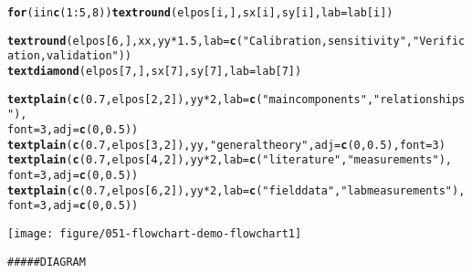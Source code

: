 \documentclass{article}\usepackage[]{graphicx}\usepackage[]{color}
\makeatletter
\def\maxwidth{ %
  \ifdim\Gin@nat@width>\linewidth
    \linewidth
  \else
    \Gin@nat@width
  \fi
}
\newcommand{\hlfunctioncall}[1]{\textcolor[rgb]{0.501960784313725,0,0.329411764705882}{\textbf{#1}}}%
\newcommand{\hlstring}[1]{\textcolor[rgb]{0.6,0.6,1}{#1}}%
\newcommand{\hlcomment}[1]{\textcolor[rgb]{0.180392156862745,0.6,0.341176470588235}{#1}}%
\newenvironment{kframe}{%
 \def\at@end@of@kframe{}%
 \ifinner\ifhmode%
  \def\at@end@of@kframe{\end{minipage}}%
  \begin{minipage}{\columnwidth}%
 \fi\fi%
 \def\FrameCommand##1{\hskip\@totalleftmargin \hskip-\fboxsep
 \colorbox{shadecolor}{##1}\hskip-\fboxsep
     \hskip-\linewidth \hskip-\@totalleftmargin \hskip\columnwidth}%
 \MakeFramed {\advance\hsize-\width
   \@totalleftmargin\z@ \linewidth\hsize
   \@setminipage}}%
 {\par\unskip\endMakeFramed%
 \at@end@of@kframe}
\newenvironment{knitrout}{}{} %
\makeatother
\begin{document}
\begin{knitrout}
\begin{kframe}
\begin{alltt}
\hlfunctioncall{for} (i in \hlfunctioncall{c}(1:5, 8)) \hlfunctioncall{textround}(elpos[i, ], sx[i], sy[i], lab = lab[i])

\hlfunctioncall{textround}(elpos[6, ], xx, yy * 1.5, lab = \hlfunctioncall{c}(\hlstring{"Calibration,sensitivity"}, \hlstring{"Verification,validation"}))
\hlfunctioncall{textdiamond}(elpos[7, ], sx[7], sy[7], lab = lab[7])

\hlfunctioncall{textplain}(\hlfunctioncall{c}(0.7, elpos[2, 2]), yy * 2, lab = \hlfunctioncall{c}(\hlstring{"main components"}, \hlstring{"relationships"}), 
    font = 3, adj = \hlfunctioncall{c}(0, 0.5))
\hlfunctioncall{textplain}(\hlfunctioncall{c}(0.7, elpos[3, 2]), yy, \hlstring{"general theory"}, adj = \hlfunctioncall{c}(0, 0.5), font = 3)
\hlfunctioncall{textplain}(\hlfunctioncall{c}(0.7, elpos[4, 2]), yy * 2, lab = \hlfunctioncall{c}(\hlstring{"literature"}, \hlstring{"measurements"}), 
    font = 3, adj = \hlfunctioncall{c}(0, 0.5))
\hlfunctioncall{textplain}(\hlfunctioncall{c}(0.7, elpos[6, 2]), yy * 2, lab = \hlfunctioncall{c}(\hlstring{"field data"}, \hlstring{"lab measurements"}), 
    font = 3, adj = \hlfunctioncall{c}(0, 0.5))
\end{alltt}
\end{kframe}
\texttt{[image: figure/051-flowchart-demo-flowchart1]} 
\begin{kframe}\begin{alltt}

\hlcomment{##### DIAGRAM}


\end{alltt}
\end{kframe}
\end{knitrout}
\end{document}
